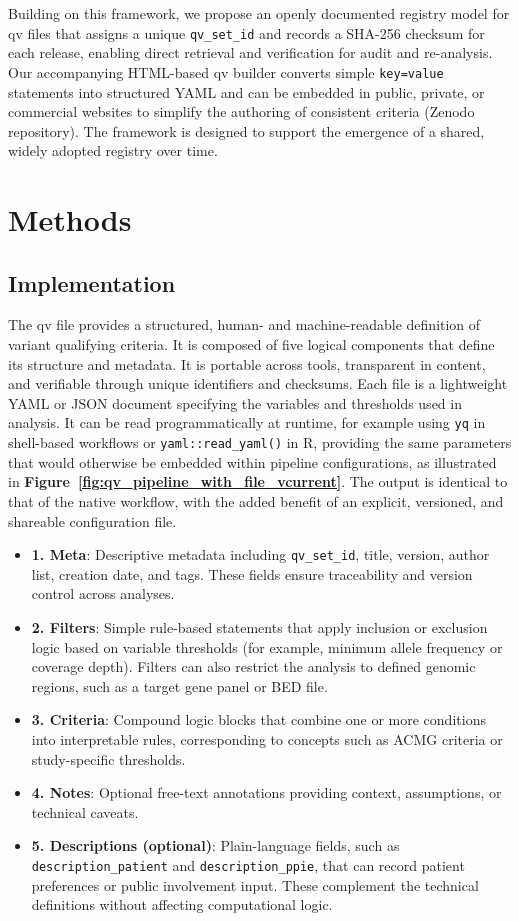 Building on this framework, we propose an openly documented registry model for \ac{qv} files that assigns a unique \texttt{qv\_set\_id} and records a SHA-256 checksum for each release, enabling direct retrieval and verification for audit and re-analysis. Our accompanying HTML-based \ac{qv} builder converts simple \texttt{key=value} statements into structured YAML and can be embedded in public, private, or commercial websites to simplify the authoring of consistent criteria (Zenodo repository). The framework is designed to support the emergence of a shared, widely adopted registry over time.

\section{Methods}
\subsection{Implementation} \label{sec:framework}
The \ac{qv} file provides a structured, human- and machine-readable definition of variant qualifying criteria.
It is composed of five logical components that define its structure and metadata.
It is portable across tools, transparent in content, and verifiable through unique identifiers and checksums.
Each file is a lightweight YAML or JSON document specifying the variables and thresholds used in analysis. 
It can be read programmatically at runtime, for example using \texttt{yq} in shell-based workflows or \texttt{yaml::read\_yaml()} in R, providing the same parameters that would otherwise be embedded within pipeline configurations, as illustrated in \textbf{Figure~\ref{fig:qv_pipeline_with_file_vcurrent}}.
The output is identical to that of the native workflow, with the added benefit of an explicit, versioned, and shareable configuration file.

\begin{itemize}
    \item \textbf{1. Meta}: Descriptive metadata including \texttt{qv\_set\_id}, title, version, author list, creation date, and tags. These fields ensure traceability and version control across analyses.
    \item \textbf{2. Filters}: Simple rule-based statements that apply inclusion or exclusion logic based on variable thresholds (for example, minimum allele frequency or coverage depth). Filters can also restrict the analysis to defined genomic regions, such as a target gene panel or BED file.
    \item \textbf{3. Criteria}: Compound logic blocks that combine one or more conditions into interpretable rules, corresponding to concepts such as ACMG criteria or study-specific thresholds.
    \item \textbf{4. Notes}: Optional free-text annotations providing context, assumptions, or technical caveats.
    \item \textbf{5. Descriptions (optional)}: Plain-language fields, such as \texttt{description\_patient} and \texttt{description\_ppie}, that can record patient preferences or public involvement input. These complement the technical definitions without affecting computational logic.
\end{itemize}

